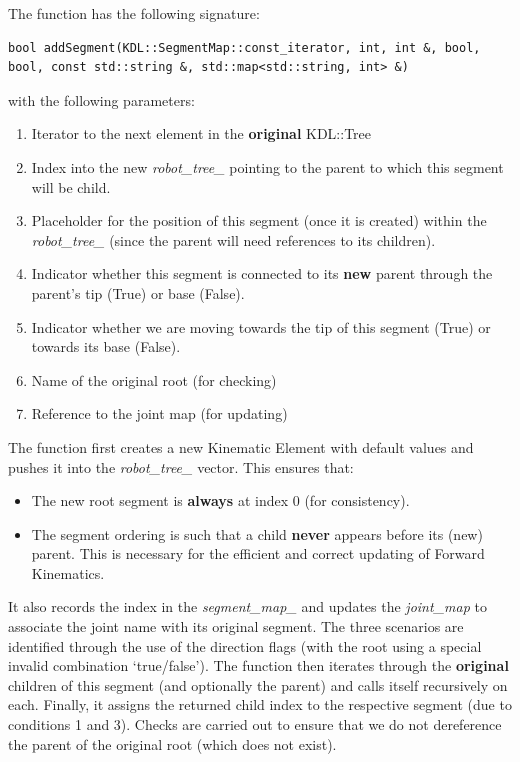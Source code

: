 \documentclass[12pt,a4paper,onecolumn]{article}
\begin{document}
\noindent The function has the following signature:
\begin{lstlisting}
bool addSegment(KDL::SegmentMap::const_iterator, int, int &, bool, bool, const std::string &, std::map<std::string, int> &)
\end{lstlisting}
with the following parameters:
\begin{enumerate}
\item Iterator to the next element in the \textbf{original} KDL::Tree
\item Index into the new \textit{robot\_tree\_} pointing to the parent to which this segment will be child.
\item Placeholder for the position of this segment (once it is created) within the \textit{robot\_tree\_} (since the parent will need references to its children).
\item Indicator whether this segment is connected to its \textbf{new} parent through the parent's tip (True) or base (False).
\item Indicator whether we are moving towards the tip of this segment (True) or towards its base (False).
\item Name of the original root (for checking)
\item Reference to the joint map (for updating)
\end{enumerate}
The function first creates a new Kinematic Element with default values and pushes it into the \textit{robot\_tree\_} vector. This ensures that:
\begin{itemize}
\item The new root segment is \textbf{always} at index 0 (for consistency).
\item The segment ordering is such that a child \textbf{never} appears before its (new) parent. This is necessary for the efficient and correct updating of Forward Kinematics.
\end{itemize}
It also records the index in the \textit{segment\_map\_} and updates the \textit{joint\_map} to associate the joint name with its original segment. The three scenarios are identified through the use of the direction flags (with the root using a special invalid combination `true/false'). The function then iterates through the \textbf{original} children of this segment (and optionally the parent) and calls itself recursively on each. Finally, it assigns the returned child index to the respective segment (due to conditions 1 and 3). Checks are carried out to ensure that we do not dereference the parent of the original root (which does not exist).
\end{document}
